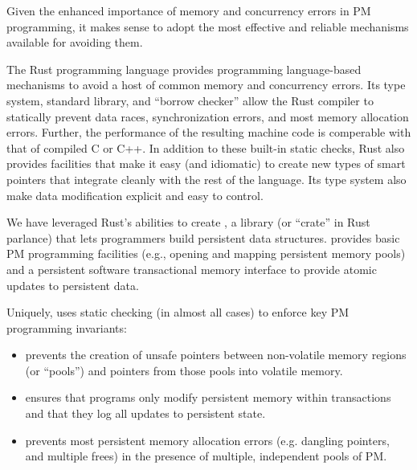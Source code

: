 
Given the enhanced importance of memory and concurrency errors in PM
programming, it makes sense to adopt the most effective and reliable mechanisms
available for avoiding them.

The Rust programming language provides programming language-based mechanisms to
avoid a host of common memory and concurrency errors.  Its type system,
standard library, and ``borrow checker'' allow the Rust compiler to statically
prevent data races, synchronization errors, and most memory
allocation errors.  Further, the performance of the resulting machine code is
comperable with that of compiled C or C++.  In addition to these built-in
static checks, Rust also provides facilities that make it easy (and idiomatic)
to create new types of smart pointers that integrate cleanly with the rest of
the language.  Its type system also make data modification explicit and easy to control.

We have leveraged Rust's abilities to create \this{}, a library (or ``crate''
in Rust parlance) that lets programmers build persistent data structures.
\This{} provides basic PM programming facilities (e.g., opening and mapping
persistent memory pools) and a persistent software transactional memory
interface to provide atomic updates to persistent data.

Uniquely, \this{} uses static checking (in almost all cases) to enforce key PM
programming invariants:

\begin{itemize}
 
\item \This{} prevents the creation of unsafe pointers between non-volatile memory regions (or ``pools'') and pointers from those pools into volatile memory.
  
\item \This{} ensures that programs only modify persistent memory within transactions and that they log all updates to persistent state.
  
\item \This{} prevents most persistent memory allocation errors (e.g. dangling pointers, and multiple frees) in the presence of multiple, independent pools of PM.
  

\end{itemize}

